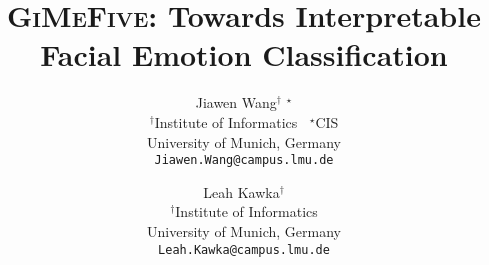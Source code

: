 \documentclass[10pt,twocolumn,letterpaper]{article}
\title{\textsc{GiMeFive}: Towards Interpretable Facial Emotion Classification}
\author{Jiawen Wang$^\dagger$ $^\star$\\ %
$^\dagger$Institute of Informatics $\:$ $^\star$CIS\\
University of Munich, Germany\\
{\tt\small Jiawen.Wang@campus.lmu.de}
\and
Leah Kawka$^\dagger$\\
$^\dagger$Institute of Informatics\\
University of Munich, Germany\\
{\tt\small Leah.Kawka@campus.lmu.de}
}
\begin{document}
\maketitle
    

% 

{
    \small
    
    
}

 
\end{document}
